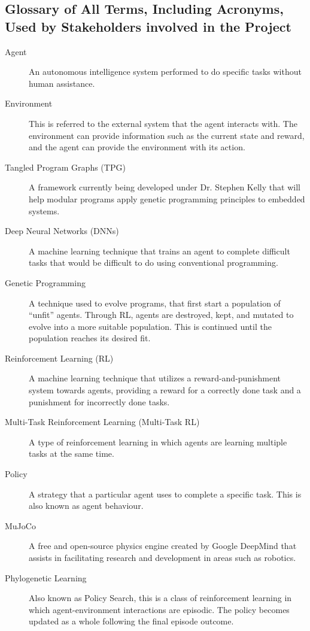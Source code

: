\documentclass[12pt]{article}
\newcommand{\lips}{\textit{Insert your content here.}}
\begin{document}
\subsection{Glossary of All Terms, Including Acronyms, Used by Stakeholders
involved in the Project}
\begin{description}
  \item [Agent]\label{def:agent} An autonomous intelligence system performed to do specific tasks without human assistance.
  \item [Environment]\label{def:environment} This is referred to the external system that the agent interacts with. The environment can provide information such as the current state and reward, and the agent can provide the environment with its action.
  \item [Tangled Program Graphs (TPG)]\label{def:tpg} A framework currently being developed under Dr. Stephen Kelly that will help modular programs apply genetic programming principles to embedded systems.
  \item [Deep Neural Networks (DNNs)]\label{def:dnn} A machine learning technique that trains an agent to complete difficult tasks that would be difficult to do using conventional programming.
  \item [Genetic Programming]\label{def:genetic_programming} A technique used to evolve programs, that first start a population of “unfit” agents. Through RL, agents are destroyed, kept, and mutated to evolve into a more suitable population. This is continued until the population reaches its desired fit.
  \item [Reinforcement Learning (RL)]\label{def:rl} A machine learning technique that utilizes a reward-and-punishment system towards agents, providing a reward for a correctly done task and a punishment for incorrectly done tasks.
  \item [Multi-Task Reinforcement Learning (Multi-Task RL)]\label{def:mulittask_rl} A type of reinforcement learning in which agents are learning multiple tasks at the same time.
  \item [Policy]\label{def:policy} A strategy that a particular agent uses to complete a specific task. This is also known as agent behaviour. 
  \item [MuJoCo]\label{def:mujoco} A free and open-source physics engine created by Google DeepMind that assists in facilitating research and development in areas such as robotics.
  \item [Phylogenetic Learning]\label{def:phylogenetic_learning} Also known as Policy Search, this is a class of reinforcement learning in which agent-environment interactions are episodic. The policy becomes updated as a whole following the final episode outcome.

\end{description}
\end{document}
